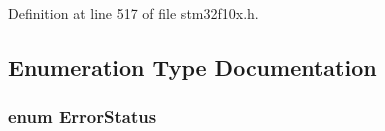 Definition at line 517 of file stm32f10x.\+h.



\subsection{Enumeration Type Documentation}
\subsubsection[{\texorpdfstring{Error\+Status}{ErrorStatus}}]{\setlength{\rightskip}{0pt plus 5cm}enum {\bf Error\+Status}}\hypertarget{group___exported__types_ga8333b96c67f83cba354b3407fcbb6ee8}{}\label{group___exported__types_ga8333b96c67f83cba354b3407fcbb6ee8}
